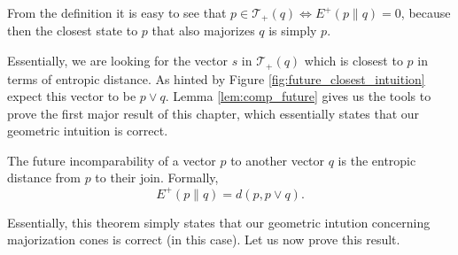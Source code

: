 \begin{remark}
    From the definition it is easy to see that $p \in \mathcal{T}_+(q) \iff E^+(p \parallel q) = 0$, because then the closest state to $p$ that also majorizes $q$ is simply $p$.
\end{remark}

Essentially, we are looking for the vector $s$ in $\mathcal{T}_+(q)$ which is closest to $p$ in terms of entropic distance. As hinted by Figure \ref{fig:future_closest_intuition} expect this vector to be $p \vee q$. Lemma \ref{lem:comp_future} gives us the tools to prove the first major result of this chapter, which essentially states that our geometric intuition is correct.

\begin{theorem} \label{th:closest_future}
    The future incomparability of a vector $p$ to another vector $q$ is the entropic distance from $p$ to their join. Formally,
    \begin{equation}
        E^+ (p \parallel q) = d(p, p \vee q).
    \end{equation}
\end{theorem}

Essentially, this theorem simply states that our geometric intution concerning majorization cones is correct (in this case). Let us now prove this result.

